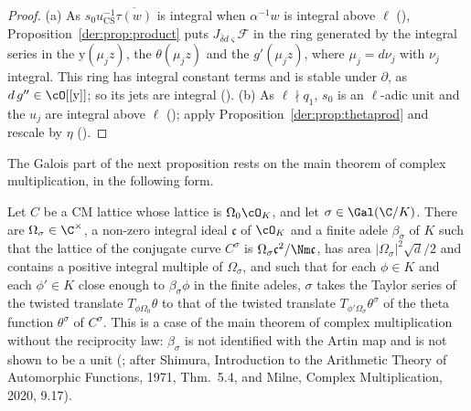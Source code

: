 \begin{proof}
(a) As $s_0u_{\mathrm{CS}}^{-1}\overline{\tau(w)}$ is integral when $\alpha^{-1}w$ is integral above
$\ell$ (),
Proposition~\ref{der:prop:product} puts $J_{\bar\delta d\varsigma}\mathcal F$ in the ring generated
by the integral series in the $\mathrm y(\mu_jz)$, the $\theta(\mu_jz)$ and the $g'(\mu_jz)$, where
$\mu_j=d\nu_j$ with $\nu_j$ integral. This ring has integral constant terms and is stable under
$\partial$, as $d\,g''\in\cO[[\mathrm y]]$; so its jets are integral
().
(b) As $\ell\nmid q_1$, $s_0$ is an $\ell$-adic unit and the $u_j$ are integral above $\ell$
(); apply Proposition~\ref{der:prop:thetaprod}
and rescale by $\eta$ ().
\end{proof}

The Galois part of the next proposition rests on the main theorem of complex multiplication, in
the following form.

\begin{fact}
\label{der:fact:cm}
Let $C$ be a CM lattice whose lattice is $\Omega_0\cO_K$, and let $\sigma\in\Gal(\C/K)$. There are
$\Omega_\sigma\in\C^\times$, a non-zero integral ideal $\mathfrak c$ of $\cO_K$ and a finite adele
$\beta_\sigma$ of $K$ such that the lattice of the conjugate curve $C^\sigma$ is
$\Omega_\sigma\mathfrak c^2/\Nm\mathfrak c$, has area $|\Omega_\sigma|^2\sqrt d/2$ and contains a
positive integral multiple of $\Omega_\sigma$, and such that for each $\phi\in K$ and each $\phi'\in K$
close enough to $\beta_\sigma\phi$ in the finite adeles, $\sigma$ takes the Taylor series of the
twisted translate $T_{\phi\Omega_0}\theta$ to that of the twisted translate
$T_{\phi'\Omega_\sigma}\theta^\sigma$ of the theta function $\theta^\sigma$ of $C^\sigma$. This is a
case of the main theorem of complex multiplication without the reciprocity law: $\beta_\sigma$ is
not identified with the Artin map and is not shown to be a unit (;
after Shimura, Introduction to the Arithmetic Theory of Automorphic Functions, 1971, Thm.~5.4, and
Milne, Complex Multiplication, 2020, 9.17).
\end{fact}

